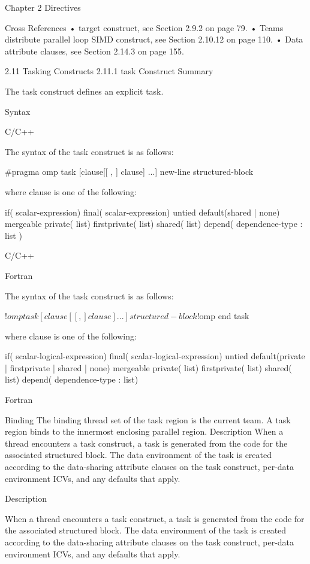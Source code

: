 Chapter 2 Directives

Cross References
• target construct, see Section 2.9.2 on page 79.
• Teams distribute parallel loop SIMD construct, see Section 2.10.12 on page 110.
• Data attribute clauses, see Section 2.14.3 on page 155.

2.11 Tasking Constructs
2.11.1 task Construct Summary

The task construct defines an explicit task.

Syntax

C/C++

The syntax of the task construct is as follows:


#pragma omp task [clause[[ , ] clause] ...] new-line
structured-block

where clause is one of the following:

if( scalar-expression)
final( scalar-expression)
untied
default(shared | none)
mergeable
private( list)
firstprivate( list)
shared( list)
depend( dependence-type : list )

C/C++

Fortran

The syntax of the task construct is as follows:

!$omp task [clause[[ , ] clause] ...]
structured-block
!$omp end task

where clause is one of the following:

if( scalar-logical-expression)
final( scalar-logical-expression)
untied
default(private | firstprivate | shared | none)
mergeable
private( list)
firstprivate( list)
shared( list)
depend( dependence-type : list)

Fortran

Binding The binding thread set of the task region is the current team. A task region binds to the innermost enclosing parallel region.  Description When a thread encounters a task construct, a task is generated from the code for the associated structured block. The data environment of the task is created according to the data-sharing attribute clauses on the task construct, per-data environment ICVs, and any defaults that apply.

Description

When a thread encounters a task construct, a task is generated from the code for the associated structured block. The data environment of the task is created according to the data-sharing attribute clauses on the task construct, per-data environment ICVs, and any defaults that apply.

